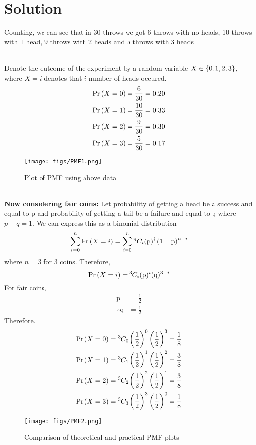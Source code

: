 \documentclass[journal,12pt,twocolumn]{IEEEtran}
\begin{document}
\section{Solution}
\solution{}
Counting, we can see that in 30 throws we got 6 throws with no heads, 10 throws with 1 head, 9 throws with 2 heads and 5 throws with 3 heads
\begin{table}[ht!]
    \centering
    \label{table:table2}	
\end{table} \\
Denote the outcome of the experiment by a random variable $X\in \left\{0, 1, 2, 3\right\}$, where $ X = i$ denotes that $i$ number of heads occured.
\begin{align}
    \Pr\left(X = 0\right) = \frac{6}{30} = 0.20 \\
    \Pr\left(X = 1\right) = \frac{10}{30} = 0.33 \\
    \Pr\left(X = 2\right) = \frac{9}{30} = 0.30 \\
    \Pr\left(X = 3\right) = \frac{5}{30} = 0.17 
\end{align}
\begin{figure}[ht!]
    \centering
    \texttt{[image: figs/PMF1.png]}
    \caption{Plot of PMF using above data}\label{fig:Figure 1}
\end{figure}\\
\textbf{Now considering fair coins:}
Let probability of getting a head be a success and equal to p and probability of getting a tail be a failure and equal to q where $p+q = 1$. We can express this as a binomial distribution
\begin{equation}
   \sum_{i=0}^{n} \Pr\left(X = i\right) =  \sum_{i=0}^{n} {{}^{n}\mkern-1muC_{i}}(\text{p})^i\left(1-\text{p}\right)^{n-i}
\end{equation}
where $n = 3$ for 3 coins. Therefore,
\begin{equation}
\Pr\left(X = i\right) = {{}^{3}\mkern-1muC_{i}} (\text{p})^i (\text{q})^{3-i}    
\end{equation}
For fair coins, 
\begin{align}
   \text{p} &= \frac{1}{2}\\
  \therefore  \text{q} &= \frac{1}{2}
\end{align}
Therefore,
\begin{align}
    \Pr\left(X = 0\right) &= {{}^{3}\mkern-1muC_{0}}\left(\frac{1}{2}\right)^0\left(\frac{1}{2}\right)^3 = \frac{1}{8}\\
    \Pr\left(X = 1\right) &= {{}^{3}\mkern-1muC_{1}}\left(\frac{1}{2}\right)^1\left(\frac{1}{2}\right)^2 = \frac{3}{8}\\
    \Pr\left(X = 2\right) &= {{}^{3}\mkern-1muC_{2}}\left(\frac{1}{2}\right)^2\left(\frac{1}{2}\right)^1 = \frac{3}{8}\\
    \Pr\left(X = 3\right) &= {{}^{3}\mkern-1muC_{3}}\left(\frac{1}{2}\right)^3\left(\frac{1}{2}\right)^0 = \frac{1}{8}
\end{align} 
\begin{figure}[!ht]
    \centering
    \texttt{[image: figs/PMF2.png]}
    \caption{Comparison of theoretical and practical PMF plots}
\end{figure}
\end{document}

